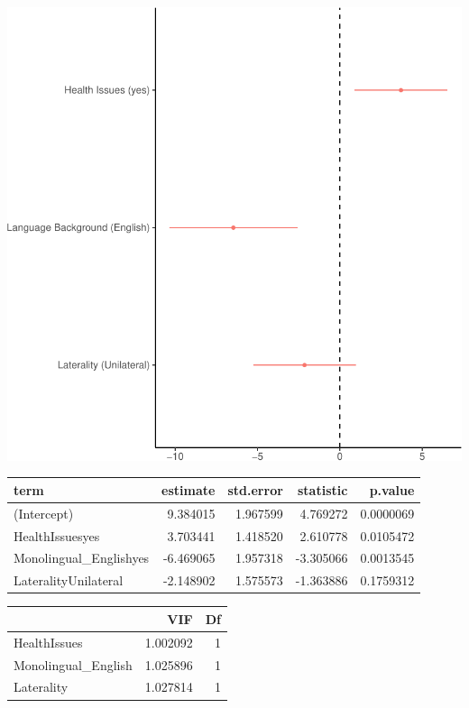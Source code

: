 \documentclass[english,man]{apa6}
\begin{document}
\includegraphics{ELSSP_paper_files/figure-latex/diagnosis-betas-1.pdf}

\begin{table}[H]
\centering
\begin{tabular}{l|r|r|r|r}
\hline
term & estimate & std.error & statistic & p.value\\
\hline
(Intercept) & 9.384015 & 1.967599 & 4.769272 & 0.0000069\\
\hline
HealthIssuesyes & 3.703441 & 1.418520 & 2.610778 & 0.0105472\\
\hline
Monolingual\_Englishyes & -6.469065 & 1.957318 & -3.305066 & 0.0013545\\
\hline
LateralityUnilateral & -2.148902 & 1.575573 & -1.363886 & 0.1759312\\
\hline
\end{tabular}
\end{table}

\begin{table}[H]
\centering
\begin{tabular}{l|r|r}
\hline
  & VIF & Df\\
\hline
HealthIssues & 1.002092 & 1\\
\hline
Monolingual\_English & 1.025896 & 1\\
\hline
Laterality & 1.027814 & 1\\
\hline
\end{tabular}
\end{table}
\end{document}
